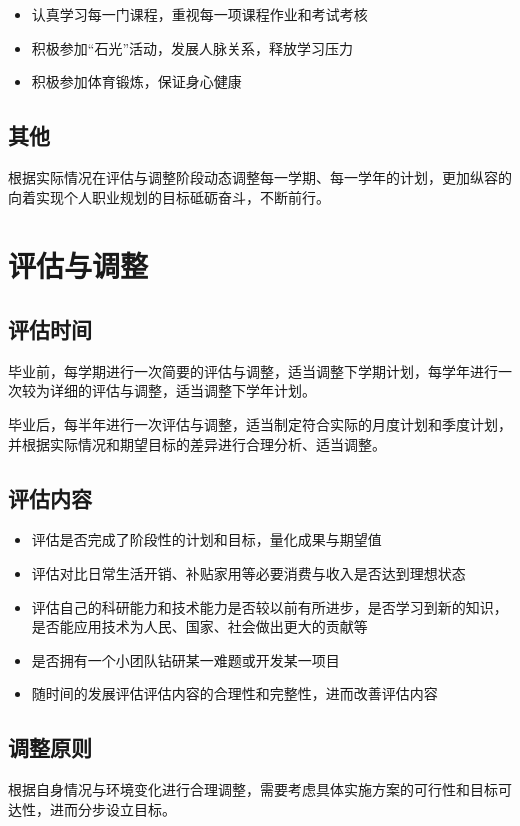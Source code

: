 \documentclass{article}
\begin{document}
\begin{itemize}
    \item 认真学习每一门课程，重视每一项课程作业和考试考核
    \item 积极参加“石光”活动，发展人脉关系，释放学习压力
    \item 积极参加体育锻炼，保证身心健康
\end{itemize}

\subsection{其他}

根据实际情况在评估与调整阶段动态调整每一学期、每一学年的计划，更加纵容的向着实现个人职业规划的目标砥砺奋斗，不断前行。

\section{评估与调整}

\subsection{评估时间}

毕业前，每学期进行一次简要的评估与调整，适当调整下学期计划，每学年进行一次较为详细的评估与调整，适当调整下学年计划。

毕业后，每半年进行一次评估与调整，适当制定符合实际的月度计划和季度计划，并根据实际情况和期望目标的差异进行合理分析、适当调整。

\subsection{评估内容}

\begin{itemize}
    \item 评估是否完成了阶段性的计划和目标，量化成果与期望值
    \item 评估对比日常生活开销、补贴家用等必要消费与收入是否达到理想状态
    \item 评估自己的科研能力和技术能力是否较以前有所进步，是否学习到新的知识，是否能应用技术为人民、国家、社会做出更大的贡献等
    \item 是否拥有一个小团队钻研某一难题或开发某一项目
    \item 随时间的发展评估评估内容的合理性和完整性，进而改善评估内容
\end{itemize}

\subsection{调整原则}

根据自身情况与环境变化进行合理调整，需要考虑具体实施方案的可行性和目标可达性，进而分步设立目标。
\end{document}
